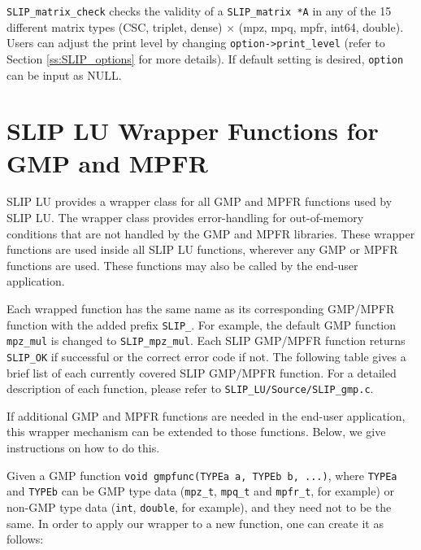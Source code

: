 \documentclass[12pt]{article}
\theoremstyle{definition}
\begin{document}
\verb|SLIP_matrix_check| checks the validity of a \verb|SLIP_matrix *A| in any
of the 15 different matrix types (CSC, triplet, dense) $\times$ (mpz, mpq,
mpfr, int64, double). Users can adjust the print level by changing
\verb|option->print_level| (refer to Section \ref{ss:SLIP_options} for more
details).
If default setting is desired, \verb|option| can be input as NULL.

\section{SLIP LU Wrapper Functions for GMP and MPFR}

SLIP LU provides a wrapper class for all GMP and MPFR functions used by SLIP
LU.  The wrapper class provides error-handling for out-of-memory conditions
that are not handled by the GMP and MPFR libraries.  These wrapper functions
are used inside all SLIP LU functions, wherever any GMP or MPFR functions are
used.  These functions may also be called by the end-user application.

Each wrapped function has the same name as its corresponding GMP/MPFR function
with the added prefix \verb|SLIP_|. For example, the default GMP function
\verb|mpz_mul| is changed to \verb|SLIP_mpz_mul|. Each SLIP GMP/MPFR function
returns \verb|SLIP_OK| if successful or the correct error code if not. The
following table gives a brief list of each currently covered SLIP GMP/MPFR
function. For a detailed description of each function, please refer to
\verb|SLIP_LU/Source/SLIP_gmp.c|.

If additional GMP and MPFR functions are needed in the end-user application,
this wrapper mechanism can be extended to those functions.  Below, we give
instructions on how to do this.

Given a GMP function \verb|void gmpfunc(TYPEa a, TYPEb b, ...)|, where
\verb|TYPEa| and \verb|TYPEb| can be GMP type data (\verb|mpz_t|,
\verb|mpq_t| and \verb|mpfr_t|, for example) or non-GMP type data (\verb|int|,
\verb|double|, for example), and they need not to be the same. In order to
apply our wrapper to a new function, one can create it as follows:
\end{document}
